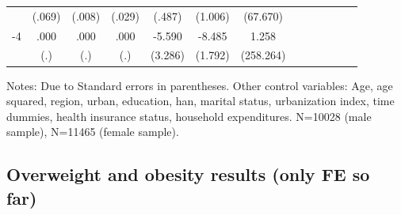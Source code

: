 \begin{table}[h]
\begin{adjustbox}{max width=\linewidth}
\begin{threeparttable}
{\begin{tabular}{l*{6}{SS}}
                &   (.069)         &   (.008)         &   (.029)         &   (.487)         &  (1.006)         & (67.670)         \\
-4             &     .000         &     .000         &     .000         &   -5.590\sym{*}  &   -8.485\sym{***}&    1.258         \\
                &      (.)         &      (.)         &      (.)         &  (3.286)         &  (1.792)         &(258.264)         \\      
\bottomrule
\end{tabular}
\begin{tablenotes}
\item Notes: Due to    Standard errors in parentheses.
Other control variables: Age, age squared, region, urban, education, han, marital status, urbanization index, time dummies, health insurance status, household expenditures.    N=10028 (male sample), N=11465 (female sample).
\end{tablenotes}
}
\end{threeparttable}
\end{adjustbox}
\end{table}

\FloatBarrier





\subsection*{Overweight and obesity results (only FE so far)}

